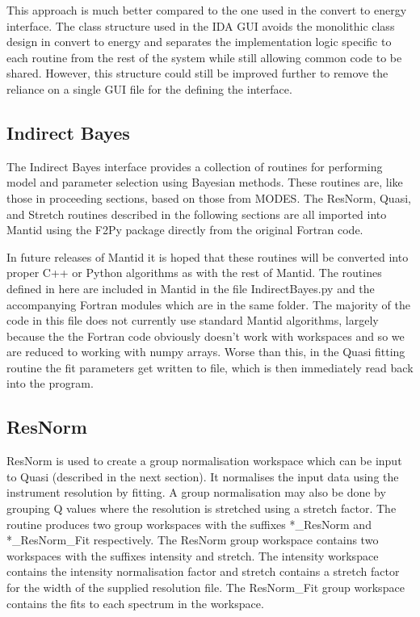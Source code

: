 \documentclass[paper=a4, fontsize=11pt]{scrartcl}	%
\numberwithin{equation}{section}															%
\numberwithin{figure}{section}																%
\numberwithin{table}{section}																%
\begin{document}
This approach is much better compared to the one used in the convert to energy interface. The class structure used in the IDA GUI avoids the monolithic class design in convert to energy and separates the implementation logic specific to each routine from the rest of the system while still allowing common code to be shared. However, this structure could still be improved further to remove the reliance on a single GUI file for the defining the interface.

\subsection{Indirect Bayes}

The Indirect Bayes interface provides a collection of routines for performing model and parameter selection using Bayesian methods. These routines are, like those in proceeding sections, based on those from MODES. The ResNorm, Quasi, and Stretch routines described in the following sections are all imported into Mantid using the F2Py package directly from the original Fortran code. 

In future releases of Mantid it is hoped that these routines will be converted into proper C++ or Python algorithms as with the rest of Mantid. The routines defined in here are included in Mantid in the file IndirectBayes.py and the accompanying Fortran modules which are in the same folder. The majority of the code in this file does not currently use standard Mantid algorithms, largely because the the Fortran code obviously doesn't work with workspaces and so we are reduced to working with numpy arrays. Worse than this, in the Quasi fitting routine the fit parameters get written to file, which is then immediately read back into the program.

\subsection{ResNorm}
ResNorm is used to create a group normalisation workspace which can be input to Quasi (described in the next section). It normalises the input data using the instrument resolution by fitting. A group normalisation may also be done by grouping Q values where the resolution is stretched using a stretch factor. The routine produces two group workspaces with the suffixes \**\_ResNorm and \**\_ResNorm\_Fit respectively. The ResNorm group workspace contains two workspaces with the suffixes intensity and stretch. The intensity workspace contains the intensity normalisation factor and stretch contains a stretch factor for the width of the supplied resolution file. The ResNorm\_Fit group workspace contains the fits to each spectrum in the workspace.
\end{document}
